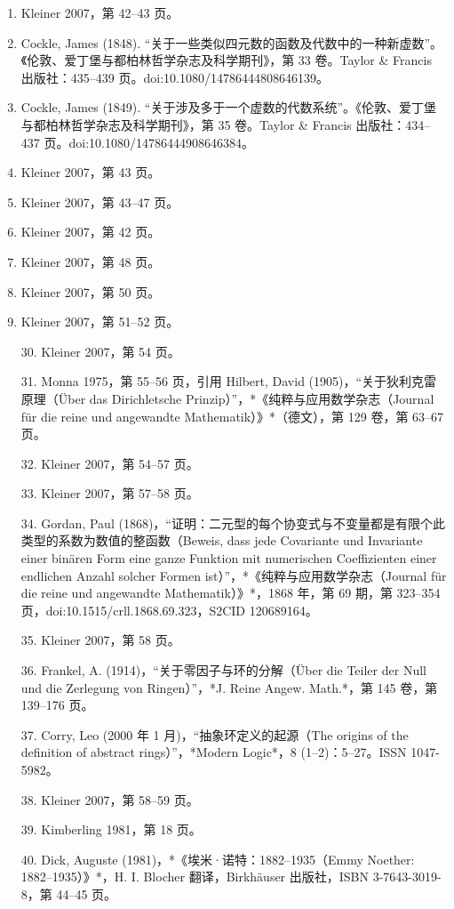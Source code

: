 \begin{enumerate}
\item Kleiner 2007，第 42–43 页。
\item Cockle, James (1848). “关于一些类似四元数的函数及代数中的一种新虚数”。《伦敦、爱丁堡与都柏林哲学杂志及科学期刊》，第 33 卷。Taylor & Francis 出版社：435–439 页。doi:10.1080/14786444808646139。
\item Cockle, James (1849). “关于涉及多于一个虚数的代数系统”。《伦敦、爱丁堡与都柏林哲学杂志及科学期刊》，第 35 卷。Taylor & Francis 出版社：434–437 页。doi:10.1080/14786444908646384。
\item Kleiner 2007，第 43 页。
\item Kleiner 2007，第 43–47 页。
\item Kleiner 2007，第 42 页。
\item Kleiner 2007，第 48 页。

\item Kleiner 2007，第 50 页。
\item Kleiner 2007，第 51–52 页。

30. Kleiner 2007，第 54 页。

31. Monna 1975，第 55–56 页，引用 Hilbert, David (1905)，“关于狄利克雷原理（Über das Dirichletsche Prinzip）”，*《纯粹与应用数学杂志（Journal für die reine und angewandte Mathematik）》*（德文），第 129 卷，第 63–67 页。

32. Kleiner 2007，第 54–57 页。

33. Kleiner 2007，第 57–58 页。

34. Gordan, Paul (1868)，“证明：二元型的每个协变式与不变量都是有限个此类型的系数为数值的整函数（Beweis, dass jede Covariante und Invariante einer binären Form eine ganze Funktion mit numerischen Coeffizienten einer endlichen Anzahl solcher Formen ist）”，*《纯粹与应用数学杂志（Journal für die reine und angewandte Mathematik）》*，1868 年，第 69 期，第 323–354 页，doi:10.1515/crll.1868.69.323，S2CID 120689164。

35. Kleiner 2007，第 58 页。

36. Frankel, A. (1914)，“关于零因子与环的分解（Über die Teiler der Null und die Zerlegung von Ringen）”，*J. Reine Angew. Math.*，第 145 卷，第 139–176 页。

37. Corry, Leo (2000 年 1 月)，“抽象环定义的起源（The origins of the definition of abstract rings）”，*Modern Logic*，8 (1–2)：5–27。ISSN 1047-5982。

38. Kleiner 2007，第 58–59 页。

39. Kimberling 1981，第 18 页。

40. Dick, Auguste (1981)，*《埃米·诺特：1882–1935（Emmy Noether: 1882–1935）》*，H. I. Blocher 翻译，Birkhäuser 出版社，ISBN 3-7643-3019-8，第 44–45 页。


\end{enumerate}
